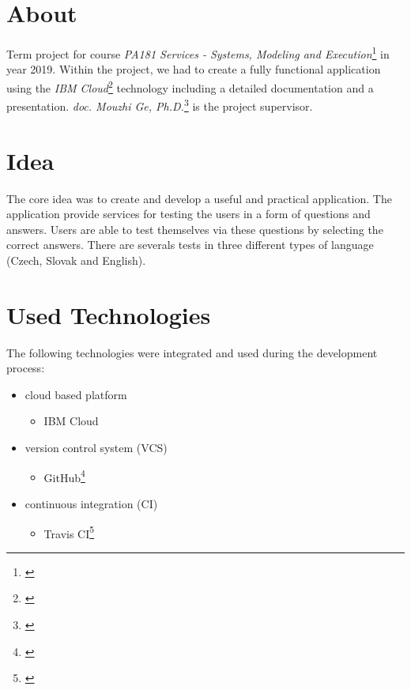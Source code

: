 \documentclass[11pt,a4paper]{article}
\begin{document}
\setlength{\parskip}{0pt}
    \hypersetup{hidelinks}\tableofcontents
\setlength{\parskip}{0pt}

\newpage

\section{About}

Term project for course \textit{PA181 Services - Systems, Modeling and Execution}\footnote{\href{https://is.muni.cz/predmet/fi/jaro2019/PA181}{\color{urlcolor}{is.muni.cz/predmet/fi/jaro2019/PA181}}} in year 2019. Within the project, we had to create a fully functional application using the \textit{IBM Cloud}\footnote{\href{https://cloud.ibm.com/}{\color{urlcolor}{cloud.ibm.com}}} technology including a detailed documentation and a presentation. \textit{doc. Mouzhi Ge, Ph.D.}\footnote{\href{https://is.muni.cz/auth/osoba/239833}{\color{urlcolor}{is.muni.cz/auth/osoba/239833}}} is the project supervisor.

\section{Idea}

The core idea was to create and develop a useful and practical application. The application provide services for testing the users in a form of questions and answers. Users are able to test themselves via these questions by selecting the correct answers. There are severals tests in three different types of language (Czech, Slovak and English).

\section{Used Technologies}

The following technologies were integrated and used during the development process:
\begin{itemize}
    \item cloud based platform
    \begin{itemize}
        \item IBM Cloud
    \end{itemize}

    \item version control system (VCS)
    \begin{itemize}
        \item GitHub\footnote{\href{https://github.com/}{\color{urlcolor}{github.com}}}
    \end{itemize}

    \item continuous integration (CI)
    \begin{itemize}
        \item Travis CI\footnote{\href{https://travis-ci.org/}{\color{urlcolor}{travis-ci.org}}}
    \end{itemize}
\end{itemize}
\end{document}
